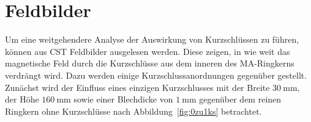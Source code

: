 \section{Feldbilder}
Um eine weitgehendere Analyse der Auswirkung von Kurzschl\"ussen zu f\"uhren, k\"onnen aus CST Feldbilder ausgelesen werden. Diese zeigen, in wie weit das magnetische Feld durch die Kurzschl\"usse aus dem inneren des MA-Ringkerns verdr\"angt wird. Dazu werden einige Kurzschlussanordnungen gegen\"uber gestellt. Zun\"achst wird der Einfluss eines einzigen Kurzschlusses mit der Breite $\SI{30}{\milli\meter}$, der H\"ohe $\SI{160}{\milli\meter}$ sowie einer Blechdicke von $\SI{1}{\milli\meter}$ gegen\"uber dem reinen Ringkern ohne Kurzschl\"usse nach Abbildung~\ref{fig:0zu1ks} betrachtet.


\newpage



